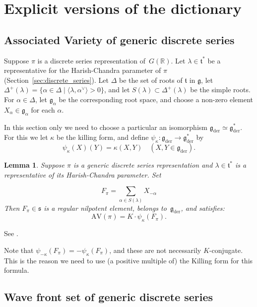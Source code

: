 \documentclass[10pt,leqno]{article}
\newtheorem{lemma}[equation]{Lemma}
\numberwithin{equation}{section}
\newcommand{\R}{\mathbb R}
\newcommand{\ch}[1]{#1^\vee}
\renewcommand{\t}{\mathfrak t}
\newcommand{\g}{\mathfrak g}
\newcommand{\gder}{\mathfrak g_{\mathrm{der}}}
\newcommand{\s}{\mathfrak s}
\newcommand{\AV}{\mathrm{AV}}
\begin{document}
\section{Explicit versions of the dictionary}\label{sec:explicit}

\subsection{Associated Variety of generic discrete series}
\label{s:AV}

Suppose $\pi$ is a  discrete series representation of~$G(\R)$. Let
$\lambda\in\t^*$ be a representative for the Harish-Chandra parameter of $\pi$ (Section~\ref{sec:discrete_series}). Let $\Delta$ be the set of roots of $\t$ in $\g$, 
let $\Delta^+(\lambda)=\{\alpha \in \Delta \mid \langle\lambda,\ch\alpha\rangle>0\}$,
and let $S(\lambda)\subset\Delta^+(\lambda)$ be the simple roots.
For $\alpha\in \Delta$, let $\g_\alpha$ be the corresponding root space, and choose a non-zero element $X_\alpha\in\g_\alpha$ for each $\alpha$.

In this section only we need to  choose a particular an isomorphism \mbox{$\gder\simeq \gder^*$}.
For this we let $\kappa$ be the killing form, and define $\psi_\kappa:\gder\rightarrow \gder^*$ by
$$
\psi_\kappa(X)(Y)=\kappa(X,Y)\quad (X,Y\in \gder).
$$

\begin{lemma}
\label{l:pi_to_av}
  \label{l:AV}
Suppose $\pi$ is a generic discrete series representation and $\lambda\in\t^*$ is a representative of its  Harish-Chandra parameter.
Set

\begin{equation}
  \label{e:Fpi}
  F_\pi=\sum_{\alpha\in S(\lambda)}X_{-\alpha}
\end{equation}
Then $F_\pi\in\s$ is a regular nilpotent element, belongs to~$\gder$, and satisfies: 
$$
\AV(\pi)=K\cdot \psi_\kappa(F_\pi).
$$
\end{lemma}
See
\cite[Propositions A.7 and A.9]{AV1}.

\begin{remarkplain}
Note that $\psi_{-\kappa}(F_\pi)=-\psi_{\kappa}(F_\pi)$, and these are not necessarily $K$-conjugate.
  This is the reason we need to use (a positive multiple of) the Killing form for this formula.
\end{remarkplain}

\subsection{Wave front set of generic discrete series}\label{sec:asymp_cone}
\end{document}
